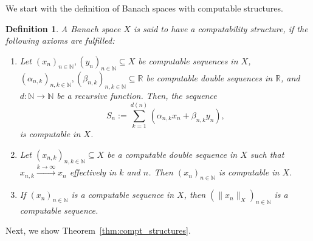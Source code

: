 \documentclass[pdflatex]{sn-jnl}%
\newtheorem{definition}[theorem]{Definition}
\begin{document}
We start with the definition of Banach spaces with computable structures.
\begin{definition}\label{def:comp_str}
A Banach space $X$ is said to have a \emph{computability structure}, if the following axioms are fulfilled:
\begin{enumerate}
    \item Let $(x_n)_{n\in \mathbb{N}},(y_n)_{n\in \mathbb{N}}\subseteq X$ be computable sequences in $X$, $(\alpha_{n,k})_{n,k\in \mathbb{N}}, (\beta_{n,k})_{n,k\in \mathbb{N}}\subseteq\mathbb{R}$ be computable double sequences in $\mathbb{R}$, and $d:\mathbb{N}\rightarrow \mathbb{N}$ be a recursive function. Then, the sequence
    \begin{equation}
        S_n:=\sum\limits_{k=1}^{d(n)}(\alpha_{n,k}x_n+\beta_{n,k}y_n),
    \end{equation}
    is computable in $X$.
    \item Let $(x_{n,k})_{n,k\in \mathbb{N}}\subseteq X$ be a computable double sequence in $X$ such that $x_{n,k}\stackrel{k\rightarrow\infty}{\longrightarrow}x_n$ effectively in $k$ and $n$. Then $(x_n)_{n\in \mathbb{N}}$ is computable in $X$. 
    \item If $(x_n)_{n\in \mathbb{N}}$ is a computable sequence in $X$, then $(\|x_n\|_X)_{n\in \mathbb{N}}$ is a computable sequence. 
\end{enumerate}
\end{definition}
Next, we show Theorem~\ref{thm:compt_structures}.
\end{document}
